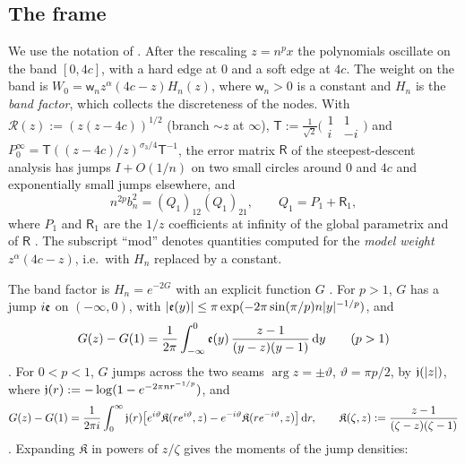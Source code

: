 \subsection{The frame}\label{sec:frame}
We use the notation of \cite[Sections~4, 8 and~10]{PaperII}. After the rescaling $z=n^px$ the polynomials oscillate on the
band $[0,4c]$, with a hard edge at $0$ and a soft edge at $4c$. The weight on the band is
$W_0=\mathsf w_nz^\alpha(4c-z)H_n(z)$, where $\mathsf w_n>0$ is a constant and $H_n$ is the \emph{band factor}, which
collects the discreteness of the nodes. With $\mathcal R(z):=(z(z-4c))^{1/2}$ (branch $\sim z$ at $\infty$),
$\mathsf T:=\frac1{\sqrt2}\bigl(\begin{smallmatrix}1&1\\i&-i\end{smallmatrix}\bigr)$ and
$P_0^\infty=\mathsf T((z-4c)/z)^{\sigma_3/4}\mathsf T^{-1}$, the error matrix $\mathsf R$ of the steepest-descent
analysis has jumps $I+O(1/n)$ on two small circles around $0$ and $4c$ and exponentially small jumps elsewhere, and
\begin{equation}\label{eq:extract}
  n^{2p}b_n^2=(Q_1)_{12}(Q_1)_{21},\qquad Q_1=P_1+\mathsf R_1,
\end{equation}
where $P_1$ and $\mathsf R_1$ are the $1/z$ coefficients at infinity of the global parametrix and of $\mathsf R$
\cite[Lemmas~4.1, 4.2 and Proposition~5.6]{PaperII}. The subscript ``mod'' denotes quantities computed for the
\emph{model weight} $z^\alpha(4c-z)$, i.e.\ with $H_n$ replaced by a constant.

The band factor is $H_n=e^{-2G}$ with an explicit function $G$ \cite[Lemmas~8.1 and~10.1]{PaperII}. For $p>1$,
$G$ has a jump $i\mathfrak e$ on $(-\infty,0)$, with $|\mathfrak e(y)|\le\pi\exp(-2\pi\sin(\pi/p)n|y|^{-1/p})$, and
\begin{equation}\label{eq:G-pgt1}
  G(z)-G(1)=\frac1{2\pi}\int_{-\infty}^0\mathfrak e(y)\,\frac{z-1}{(y-z)(y-1)}\,\mathrm{d} y\qquad(p>1)
\end{equation}
\cite[Lemma~8.1]{PaperII}. For $0<p<1$, $G$ jumps across the two seams $\arg z=\pm\vartheta$, $\vartheta=\pi p/2$, by
$\mathfrak j(|z|)$, where $\mathfrak j(r):=-\log(1-e^{-2\pi nr^{-1/p}})$, and
\begin{equation}\label{eq:G-plt1}
  G(z)-G(1)=\frac1{2\pi i}\int_0^\infty\mathfrak j(r)\bigl[e^{i\vartheta}\mathfrak K(re^{i\vartheta},z)
  -e^{-i\vartheta}\mathfrak K(re^{-i\vartheta},z)\bigr]\,\mathrm{d} r,\qquad
  \mathfrak K(\zeta,z):=\frac{z-1}{(\zeta-z)(\zeta-1)}
\end{equation}
\cite[Lemma~10.1(ii)]{PaperII}. Expanding $\mathfrak K$ in powers of $z/\zeta$ gives the moments of the jump densities:

